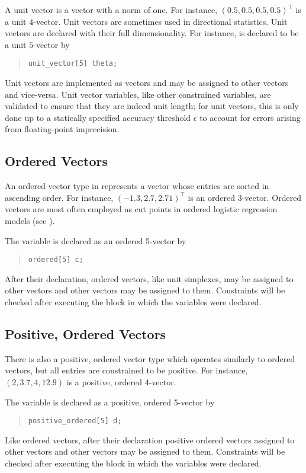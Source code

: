 A unit vector is a vector with a norm of one.  For instance,
$(0.5,0.5,0.5,0.5)^{\top}$ is a unit 4-vector.
Unit vectors are sometimes used in directional statistics.
Unit vectors are declared with their full
dimensionality.  For instance,  is declared to
be a unit $5$-vector by
%
\begin{quote}
\begin{Verbatim} 
unit_vector[5] theta;
\end{Verbatim}
\end{quote}
% 
Unit vectors are implemented as vectors and may be assigned to other
vectors and vice-versa.  Unit vector variables, like other constrained
variables, are validated to ensure that they are indeed unit length; for
unit vectors, this is only done up to a statically specified accuracy
threshold $\epsilon$ to account for errors arising from floating-point
imprecision.

\subsection{Ordered Vectors}

An ordered vector type in \Stan represents a vector whose entries are
sorted in ascending order.  For instance, $(-1.3,2.7,2.71)^{\top}$ is
an ordered 3-vector.  Ordered vectors are most often employed as cut
points in ordered logistic regression models (see
).

The variable  is declared as an ordered 5-vector by
%
\begin{quote}
\begin{Verbatim}[fontsize=\small]
ordered[5] c;
\end{Verbatim}
\end{quote}
%
After their declaration, ordered vectors, like unit simplexes, may be 
assigned to other vectors and other vectors may be assigned to them. 
Constraints will be checked after executing the block in which the 
variables were declared.  


\subsection{Positive, Ordered Vectors}

There is also a positive, ordered vector type which operates similarly
to ordered vectors, but all entries are constrained to be positive.
For instance, $(2,3.7,4,12.9)$ is a positive, ordered 4-vector.

The variable  is declared as a positive, ordered 5-vector by
%
\begin{quote}
\begin{Verbatim}[fontsize=\small]
positive_ordered[5] d;
\end{Verbatim}
\end{quote}
%
Like ordered vectors, after their declaration positive ordered vectors
assigned to other vectors and other vectors may be assigned to them. 
Constraints will be checked after executing the block in which the 
variables were declared.  

